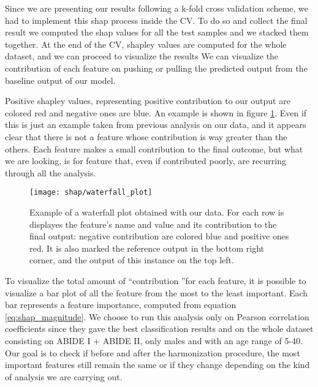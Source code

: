\documentclass[12pt]{report}
\begin{document}
Since we are presenting our results following a k-fold cross validation scheme, we had to implement this shap process inside the CV.
To do so and collect the final result we computed the shap values for all the test samples and we stacked them together.
At the end of the CV, shapley values are computed for the whole dataset, and we can proceed to visualize the results
We can visualize the contribution of each feature on pushing or pulling the predicted output from the baseline output of our model.

Positive shapley values, representing positive contribution to our output are colored red and negative ones are blue.
An example is shown in figure \ref{fig:shap_waterfall}.
Even if this is just an example taken from previous analysis on our data, and it appears clear that there is not a feature whose contribution is way greater than the others.
Each feature makes a small contribution to the final outcome, but what we are looking, is for feature that, even if contributed poorly, are recurring through all the analysis.





\begin{figure}[h]
\centering
\texttt{[image: shap/waterfall\_plot]}
\caption{Example of a waterfall plot obtained with our data. For each row is displayes the feature's name and value and its contribution to the final output: negative contribution are colored blue and positive ones red. It is also marked the reference output in the bottom right corner, and the output of this instance on the top left.
}\label{fig:shap_waterfall}
\end{figure}


To visualize the total amount of \textquotedblleft contribution \textquotedblright for each feature, it is  possible to visualize a bar plot of all the feature from the most to the least important.
Each bar represents a feature importance, computed from equation \ref{eq:shap_magnitude}.
We choose to run this analysis only on Pearson correlation coefficients since they gave the best classification results and on the whole dataset consisting on ABIDE I + ABIDE II, only males and with an age range of 5-40.
Our goal is to check if before and after the harmonization procedure, the most important features still remain the same or if they change depending on the kind of analysis we are carrying out.
\end{document}

